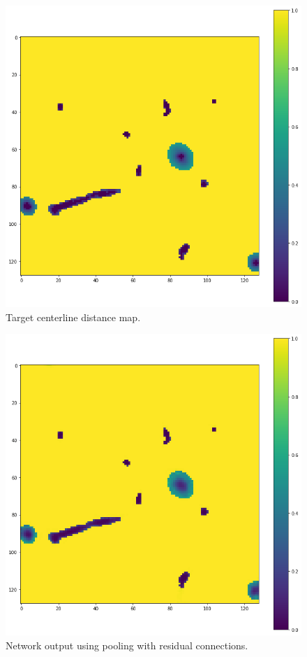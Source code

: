 \documentclass[10pt,twocolumn,letterpaper]{article}
\begin{document}
\begin{figure}[!h]
    \begin{center}
       \includegraphics[width=0.95\linewidth]{figures/output-target.png}
    \end{center}
       \caption{Target centerline distance map.}
    \label{fig:target}
\end{figure}

\begin{figure}[!h]
    \begin{center}
       \includegraphics[width=0.95\linewidth]{figures/output-pooling-residual.png}
    \end{center}
       \caption{Network output using pooling with residual connections.}
    \label{fig:output pooling}
\end{figure}
\end{document}
